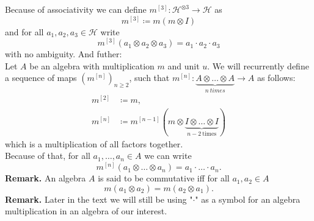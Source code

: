 \documentclass[a4paper, 12pt]{report}
\begin{document}
\indent  Because of associativity we can define $m^{[3]} : \mathcal{H}^{\otimes 3} \to \mathcal{H}$ as
\begin{equation*}
m^{[3]} \coloneqq m(m\otimes I)
\end{equation*}
and for all $a_1, a_2, a_3 \in \mathcal{H}$ write
\begin{equation*}
m^{[3]}(a_1 \otimes a_2 \otimes a_3) = a_1 \cdot a_2 \cdot a_3
\end{equation*}
with no ambiguity.
And futher: \\
\indent Let $A$ be an algebra with multiplication $m$ and unit $u$. We will recurrently define a
sequence of maps
$(m^{[n]})_{n \geq 2}$, such that $m^{[n]} : \underbrace{A \otimes \dots \otimes A}_{n\ times} \to A$
as follows:
\begin{align*}
m^{[2]} &\coloneqq m, \\
m^{[n]} &\coloneqq m^{[n-1]}(m \otimes \underbrace{I \otimes \dots \otimes I}_{n-2 \mathrm{\ times}})
\end{align*}
which is a multiplication of all factors together. \\
Because of that, for all $a_1, \dots, a_n \in A$ we can write
\begin{equation*}
m^{[n]}(a_1 \otimes \dots \otimes a_n) = a_1 \cdot \ldots \cdot a_n.
\end{equation*}
\textbf{Remark. } An algebra $A$ is said to be commutative iff for all $a_1, a_2 \in A$
\begin{equation*}
m(a_1 \otimes a_2 ) = m(a_2 \otimes a_1).
\end{equation*}
\indent \textbf{Remark. } Later in the text we will still be using "$\cdot$" as a symbol for an algebra
multiplication in an algebra of our interest.
\end{document}
